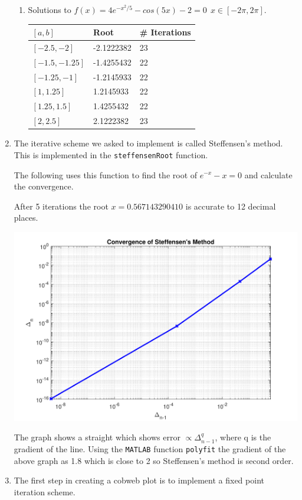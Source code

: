 \documentclass[a4paper,11pt]{article}
\begin{document}
\begin{enumerate}
\begin{enumerate}
		
		\item Solutions to $f(x) = 4e^{-x^{2}/5} - cos(5x) - 2 = 0 \  \ 
		x\in[-2\pi,2\pi]$.
		
		\begin{center}
			\begin{tabular}{l|ll}
				$[a,b]$        & Root       & \# Iterations \\ \hline
				$[-2.5,-2]$    & -2.1222382 & 23            \\
				$[-1.5,-1.25]$ & -1.4255432 & 22            \\
				$[-1.25,-1]$   & -1.2145933 & 22            \\
				$[1,1.25]$     & 1.2145933  & 22            \\
				$[1.25,1.5]$   & 1.4255432  & 22            \\
				$[2,2.5]$      & 2.1222382  & 23           
			\end{tabular}
		\end{center}
	\end{enumerate}


	\item The iterative scheme we asked to implement is called Steffensen's 
	method. This is implemented in the \verb*|steffensenRoot| function.
	
	The following uses this function to find the root of $e^{-x} - x = 0$ and 
	calculate the convergence.
	
	After 5 iterations the root $x = 0.567143290410$ is accurate to 12 
	decimal places.
	\begin{center}
		\includegraphics[scale=0.6]{images/Q1c.pdf}
	\end{center}
	The graph shows a straight which shows error $\propto \Delta_{n-1}^{q}$, 
	where q is the gradient of the line. Using the \verb*|MATLAB| function 
	\verb*|polyfit| the gradient of the 
	above graph as 1.8 which is close to 2 so Steffensen's method is second 
	order.
	
	
	\item The first step in creating a cobweb plot is to implement a fixed 
	point iteration scheme.
	
	
\end{enumerate}
\end{document}
